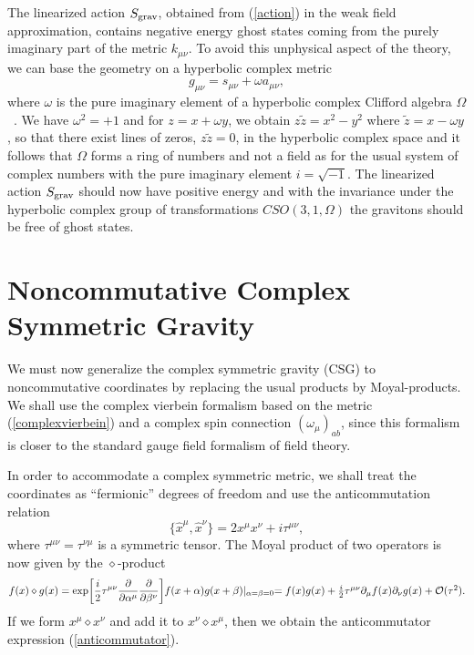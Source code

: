 \documentclass[a4paper,10pt]{article}
\begin{document}
The linearized action $S_{\rm grav}$, obtained from (\ref{action})
in the weak field approximation, contains negative energy ghost states
coming from the purely imaginary part of the metric $k_{\mu\nu}$. To avoid
this unphysical aspect of the theory, we can base the geometry on a
hyperbolic complex metric
\begin{equation}
g_{\mu\nu}=s_{\mu\nu}+\omega a_{\mu\nu},
\end{equation}
where $\omega$ is the pure imaginary element of a hyperbolic complex
Clifford algebra $\Omega$~\cite{Clifford}. We have $\omega^2=+1$ and for
$z=x+\omega y$, we obtain $z{\tilde z}=x^2-y^2$ where ${\tilde z}=x-\omega 
y$, so that there exist lines of zeros, $z{\tilde z}=0$, in the hyperbolic
complex space and it follows that $\Omega$ forms a ring of numbers and not
a field as for the usual system of complex numbers with the pure imaginary
element $i=\sqrt{-1}$. The linearized action $S_{\rm grav}$ should now have
positive energy and with the invariance under the hyperbolic complex group
of transformations $CSO(3,1,\Omega)$ the gravitons should be free of ghost
states.

\section{Noncommutative Complex Symmetric Gravity}

We must now generalize the complex symmetric gravity (CSG) to
noncommutative coordinates by replacing the usual
products by Moyal-products. We shall use the complex vierbein
formalism based on the metric (\ref{complexvierbein}) and a complex spin
connection $(\omega_\mu)_{ab}$, since this formalism is closer to the
standard gauge field formalism of field theory.

In order to accommodate a complex symmetric metric, we shall treat the
coordinates as ``fermionic'' degrees of freedom and use the anticommutation
relation
\begin{equation}
\label{anticommutator}
\{{\hat x}^\mu,{\hat x}^\nu\}=2x^\mu x^\nu+i\tau^{\mu\nu},
\end{equation}
where $\tau^{\mu\nu}=\tau^{\nu\mu}$ is a symmetric tensor.
The Moyal product of two operators is now given by the
$\diamond$-product
\begin{equation}
f(x)\diamond g(x)
=\exp\biggl[\frac{i}{2}\tau^{\mu\nu}\frac{\partial}{\partial\alpha^\mu}
\frac{\partial}{\partial\beta^\nu}\biggr]f(x+\alpha)g(x+\beta)\vert_{\alpha=\beta=0}
$$ $$
=f(x)g(x)+\frac{i}{2}\tau^{\mu\nu}\partial_\mu f(x)\partial_\nu g(x)+{\cal
O}(\tau^2).
\end{equation}
If we form $x^\mu\diamond x^\nu$ and add it to $x^\nu\diamond
x^\mu$, then we obtain the anticommutator expression
(\ref{anticommutator}).
\end{document}
